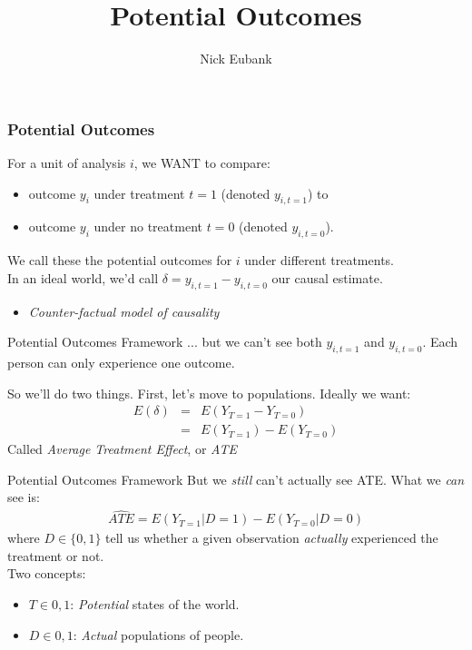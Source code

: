 \documentclass[11pt]{beamer}
\title{Potential Outcomes}
\author{\small Nick Eubank}
\date{\vspace*{.3in} \date}
\begin{document}
\begin{frame}[c]
\maketitle
\end{frame}

\begin{frame}
  \frametitle{Potential Outcomes}
\pause For a unit of analysis $i$, we WANT to compare:
\begin{itemize}
  \item outcome $y_i$ under treatment $t=1$ (denoted $y_{i, t=1}$) to
  \item outcome $y_i$ under no treatment $t=0$ (denoted $y_{i, t=0}$).
\end{itemize}
\pause We call these the \alert{potential outcomes} for $i$ under different treatments.\\
\pause In an ideal world, we'd call \alert{$\delta = y_{i, t=1} - y_{i, t=0}$} our causal estimate.
\begin{itemize}
  \pause \item \emph{Counter-factual model of causality}
\end{itemize}
\end{frame}


\begin{frame}[c]{Potential Outcomes Framework}
... but we can't see both $y_{i, t=1}$ and $y_{i, t=0}$. Each person can only experience one outcome.

So we'll do two things. First, let's move to populations. Ideally we want:
\begin{eqnarray}
  E(\delta) &=& E(Y_{T=1} - Y_{T=0}) \nonumber \\
             &=& E(Y_{T=1}) - E(Y_{T=0}) \nonumber
\end{eqnarray}
\pause Called \emph{Average Treatment Effect}, or \emph{ATE}
\end{frame}

\begin{frame}[c]{Potential Outcomes Framework}
But we \emph{still} can't actually see ATE. What we \emph{can} see is:
\begin{eqnarray}
\widehat{ATE} = E(Y_{T=1}|D=1) - E(Y_{T=0}|D=0) \nonumber
\end{eqnarray}
where $D\in\{0,1\}$ tell us whether a given observation \emph{actually} experienced the treatment or not.\\
\pause
\vspace{0.1cm}
Two concepts:
\begin{itemize}
  \item $T\in{0,1}$: \emph{Potential} states of the world.
  \item $D\in{0,1}$: \emph{Actual} populations of people.
\end{itemize}
\end{frame}
\end{document}
